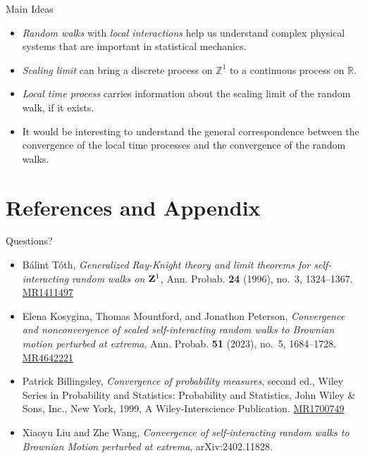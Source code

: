 \documentclass{if-beamer}
\newcommand{\MR}[1]{\href{http://www.ams.org/mathscinet-getitem?mr=#1}{MR#1}}
\begin{document}
\begin{frame}{Main Ideas}
    \begin{itemize}
        \item \emph{Random walks} with \emph{local interactions} help us understand complex physical systems that are important in statistical mechanics.
        \item \emph{Scaling limit} can bring a discrete process on $\mathbb{Z}^1$ to a continuous process on $\mathbb{R}$.
        \item \emph{Local time process} carries information about the scaling limit of the random walk, if it exists.
        \item It would be interesting to understand the general correspondence between the convergence of the local time processes and the convergence of the random walks.
    \end{itemize}
\end{frame}

\section{References and Appendix}
\begin{frame}
    \begin{center}
        \Huge Questions?
    \end{center}
\vfill
    
\begin{itemize}
\item
    B\'{a}lint T\'{o}th, \emph{Generalized {R}ay-{K}night theory and limit theorems for self-interacting random walks on {${\bf Z}^1$}}, Ann. Probab. \textbf{24} (1996), no.~3, 1324--1367. \MR{1411497}

    \item
    Elena Kosygina, Thomas Mountford, and Jonathon Peterson,  \emph{Convergence and nonconvergence of scaled self-interacting random walks to {B}rownian motion perturbed at extrema}, Ann. Probab. \textbf{51} (2023), no.~5, 1684--1728. \MR{4642221}

    \item
    Patrick Billingsley, \emph{Convergence of probability measures}, second ed., Wiley Series in Probability and Statistics: Probability and Statistics, John Wiley \& Sons, Inc., New York, 1999, A Wiley-Interscience Publication. \MR{1700749}

    \item
    Xiaoyu Liu and Zhe Wang, \emph{Convergence of self-interacting random walks to Brownian Motion perturbed at extrema}, arXiv:2402.11828.

    \end{itemize}
\end{frame}
\end{document}
